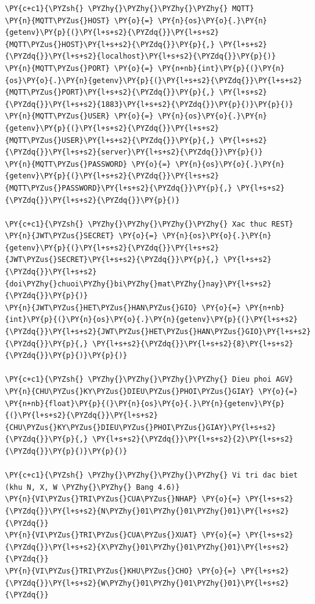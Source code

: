 \begin{Verbatim}[commandchars=\\\{\},frame=single,framerule=0.3pt,rulecolor=\color{black!40},fontsize=\footnotesize,breaklines=true]
\PY{c+c1}{\PYZsh{} \PYZhy{}\PYZhy{}\PYZhy{}\PYZhy{} MQTT}
\PY{n}{MQTT\PYZus{}HOST} \PY{o}{=} \PY{n}{os}\PY{o}{.}\PY{n}{getenv}\PY{p}{(}\PY{l+s+s2}{\PYZdq{}}\PY{l+s+s2}{MQTT\PYZus{}HOST}\PY{l+s+s2}{\PYZdq{}}\PY{p}{,} \PY{l+s+s2}{\PYZdq{}}\PY{l+s+s2}{localhost}\PY{l+s+s2}{\PYZdq{}}\PY{p}{)}
\PY{n}{MQTT\PYZus{}PORT} \PY{o}{=} \PY{n+nb}{int}\PY{p}{(}\PY{n}{os}\PY{o}{.}\PY{n}{getenv}\PY{p}{(}\PY{l+s+s2}{\PYZdq{}}\PY{l+s+s2}{MQTT\PYZus{}PORT}\PY{l+s+s2}{\PYZdq{}}\PY{p}{,} \PY{l+s+s2}{\PYZdq{}}\PY{l+s+s2}{1883}\PY{l+s+s2}{\PYZdq{}}\PY{p}{)}\PY{p}{)}
\PY{n}{MQTT\PYZus{}USER} \PY{o}{=} \PY{n}{os}\PY{o}{.}\PY{n}{getenv}\PY{p}{(}\PY{l+s+s2}{\PYZdq{}}\PY{l+s+s2}{MQTT\PYZus{}USER}\PY{l+s+s2}{\PYZdq{}}\PY{p}{,} \PY{l+s+s2}{\PYZdq{}}\PY{l+s+s2}{server}\PY{l+s+s2}{\PYZdq{}}\PY{p}{)}
\PY{n}{MQTT\PYZus{}PASSWORD} \PY{o}{=} \PY{n}{os}\PY{o}{.}\PY{n}{getenv}\PY{p}{(}\PY{l+s+s2}{\PYZdq{}}\PY{l+s+s2}{MQTT\PYZus{}PASSWORD}\PY{l+s+s2}{\PYZdq{}}\PY{p}{,} \PY{l+s+s2}{\PYZdq{}}\PY{l+s+s2}{\PYZdq{}}\PY{p}{)}

\PY{c+c1}{\PYZsh{} \PYZhy{}\PYZhy{}\PYZhy{}\PYZhy{} Xac thuc REST}
\PY{n}{JWT\PYZus{}SECRET} \PY{o}{=} \PY{n}{os}\PY{o}{.}\PY{n}{getenv}\PY{p}{(}\PY{l+s+s2}{\PYZdq{}}\PY{l+s+s2}{JWT\PYZus{}SECRET}\PY{l+s+s2}{\PYZdq{}}\PY{p}{,} \PY{l+s+s2}{\PYZdq{}}\PY{l+s+s2}{doi\PYZhy{}chuoi\PYZhy{}bi\PYZhy{}mat\PYZhy{}nay}\PY{l+s+s2}{\PYZdq{}}\PY{p}{)}
\PY{n}{JWT\PYZus{}HET\PYZus{}HAN\PYZus{}GIO} \PY{o}{=} \PY{n+nb}{int}\PY{p}{(}\PY{n}{os}\PY{o}{.}\PY{n}{getenv}\PY{p}{(}\PY{l+s+s2}{\PYZdq{}}\PY{l+s+s2}{JWT\PYZus{}HET\PYZus{}HAN\PYZus{}GIO}\PY{l+s+s2}{\PYZdq{}}\PY{p}{,} \PY{l+s+s2}{\PYZdq{}}\PY{l+s+s2}{8}\PY{l+s+s2}{\PYZdq{}}\PY{p}{)}\PY{p}{)}

\PY{c+c1}{\PYZsh{} \PYZhy{}\PYZhy{}\PYZhy{}\PYZhy{} Dieu phoi AGV}
\PY{n}{CHU\PYZus{}KY\PYZus{}DIEU\PYZus{}PHOI\PYZus{}GIAY} \PY{o}{=} \PY{n+nb}{float}\PY{p}{(}\PY{n}{os}\PY{o}{.}\PY{n}{getenv}\PY{p}{(}\PY{l+s+s2}{\PYZdq{}}\PY{l+s+s2}{CHU\PYZus{}KY\PYZus{}DIEU\PYZus{}PHOI\PYZus{}GIAY}\PY{l+s+s2}{\PYZdq{}}\PY{p}{,} \PY{l+s+s2}{\PYZdq{}}\PY{l+s+s2}{2}\PY{l+s+s2}{\PYZdq{}}\PY{p}{)}\PY{p}{)}

\PY{c+c1}{\PYZsh{} \PYZhy{}\PYZhy{}\PYZhy{}\PYZhy{} Vi tri dac biet (khu N, X, W \PYZhy{}\PYZhy{} Bang 4.6)}
\PY{n}{VI\PYZus{}TRI\PYZus{}CUA\PYZus{}NHAP} \PY{o}{=} \PY{l+s+s2}{\PYZdq{}}\PY{l+s+s2}{N\PYZhy{}01\PYZhy{}01\PYZhy{}01}\PY{l+s+s2}{\PYZdq{}}
\PY{n}{VI\PYZus{}TRI\PYZus{}CUA\PYZus{}XUAT} \PY{o}{=} \PY{l+s+s2}{\PYZdq{}}\PY{l+s+s2}{X\PYZhy{}01\PYZhy{}01\PYZhy{}01}\PY{l+s+s2}{\PYZdq{}}
\PY{n}{VI\PYZus{}TRI\PYZus{}KHU\PYZus{}CHO} \PY{o}{=} \PY{l+s+s2}{\PYZdq{}}\PY{l+s+s2}{W\PYZhy{}01\PYZhy{}01\PYZhy{}01}\PY{l+s+s2}{\PYZdq{}}
\end{Verbatim}

